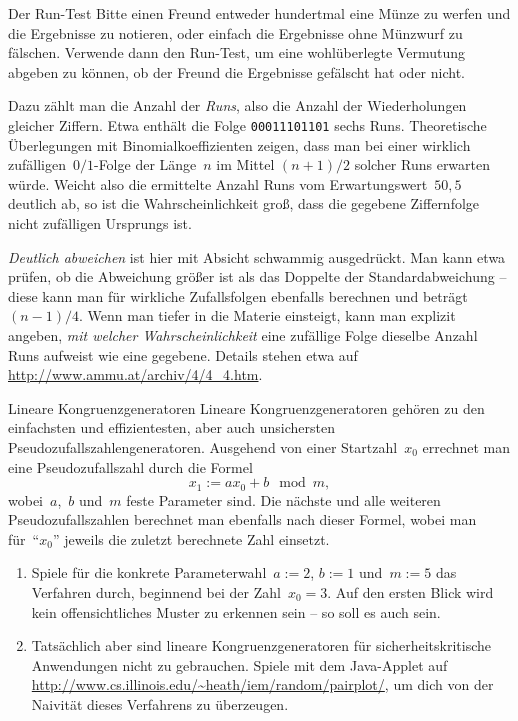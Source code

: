 \documentclass{zirkelblatt}
\begin{document}
\begin{aufgabeShaded}{Der Run-Test}
Bitte einen Freund entweder hundertmal eine Münze zu werfen und die
Ergebnisse zu notieren, oder einfach die Ergebnisse ohne Münzwurf zu fälschen.
Verwende dann den Run-Test, um eine wohlüberlegte Vermutung abgeben zu können,
ob der Freund die Ergebnisse gefälscht hat oder nicht.

Dazu zählt man die Anzahl der \emph{Runs}, also die Anzahl der Wiederholungen
gleicher Ziffern. Etwa enthält die Folge \texttt{00011101101} sechs Runs.
Theoretische Überlegungen mit Binomialkoeffizienten zeigen, dass man bei einer
wirklich zufälligen~$0/1$-Folge der Länge~$n$ im Mittel $(n+1)/2$ solcher Runs
erwarten würde. Weicht also die ermittelte Anzahl Runs vom
Erwartungswert~$50{,}5$ deutlich ab, so ist die Wahrscheinlichkeit groß, dass
die gegebene Ziffernfolge nicht zufälligen Ursprungs ist.

\emph{Deutlich abweichen} ist hier mit Absicht schwammig ausgedrückt. Man kann
etwa prüfen, ob die Abweichung größer ist als das Doppelte der Standardabweichung
-- diese kann man für wirkliche Zufallsfolgen ebenfalls berechnen und
beträgt~$(n-1)/4$. Wenn man tiefer in die Materie einsteigt, kann man explizit
angeben, \emph{mit welcher Wahrscheinlichkeit} eine zufällige Folge dieselbe
Anzahl Runs aufweist wie eine gegebene. Details stehen etwa auf
\url{http://www.ammu.at/archiv/4/4_4.htm}.
\end{aufgabeShaded}

\begin{aufgabeShaded}{Lineare Kongruenzgeneratoren}
Lineare Kongruenzgeneratoren gehören zu den einfachsten und effizientesten,
aber auch unsichersten Pseudozufallszahlengeneratoren. Ausgehend von einer
Startzahl~$x_0$ errechnet man eine Pseudozufallszahl durch die Formel
\[ x_1 := ax_0 + b \mod m, \]
wobei~$a$,~$b$ und~$m$ feste Parameter sind. Die nächste und alle weiteren
Pseudozufallszahlen berechnet man ebenfalls nach dieser Formel, wobei man
für~"`$x_0$"' jeweils die zuletzt berechnete Zahl einsetzt.
\begin{enumerate}
\item Spiele für die konkrete Parameterwahl~$a := 2$, $b := 1$ und~$m := 5$ das
Verfahren durch, beginnend bei der Zahl~$x_0 = 3$. Auf den ersten Blick wird kein
offensichtliches Muster zu erkennen sein -- so soll es auch sein.
\item Tatsächlich aber sind lineare Kongruenzgeneratoren für
sicherheitskritische Anwendungen nicht zu gebrauchen. Spiele mit dem Java-Applet auf
\url{http://www.cs.illinois.edu/~heath/iem/random/pairplot/}, um dich von der
Naivität dieses Verfahrens zu überzeugen.
\end{enumerate}
\end{aufgabeShaded}
\end{document}
